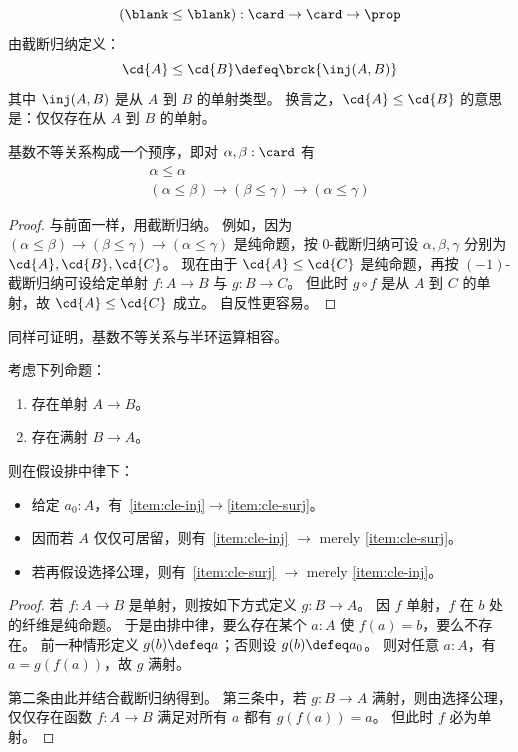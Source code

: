 \begin{defn}
  \[ (\blank\le\blank) : \card\to\card\to\prop \]
  由截断归纳定义：
  \[ \cd{A} \le \cd{B} \defeq \brck{\inj(A,B)} \]
  其中 $\inj(A,B)$ 是从 $A$ 到 $B$ 的单射类型。
  换言之，$\cd{A} \le \cd{B}$ 的意思是：仅仅存在从 $A$ 到 $B$ 的单射。
\end{defn}

\begin{lem}
  基数不等关系构成一个预序，即对 $\alpha,\beta:\card$ 有
  \begin{gather*}
    \alpha \le \alpha\\
    (\alpha \le \beta) \to (\beta\le\gamma) \to (\alpha\le\gamma)
  \end{gather*}
\end{lem}
\begin{proof}
  与前面一样，用截断归纳。
  例如，因为 $(\alpha \le \beta) \to (\beta\le\gamma) \to (\alpha\le\gamma)$ 是纯命题，按 0-截断归纳可设 $\alpha,\beta,\gamma$ 分别为 $\cd{A},\cd{B},\cd{C}$。
  现在由于 $\cd{A} \le \cd{C}$ 是纯命题，再按 $(-1)$-截断归纳可设给定单射 $f:A\to B$ 与 $g:B\to C$。
  但此时 $g\circ f$ 是从 $A$ 到 $C$ 的单射，故 $\cd{A} \le \cd{C}$ 成立。
  自反性更容易。
\end{proof}

同样可证明，基数不等关系与半环运算相容。

\begin{lem}\label{thm:injsurj}
  考虑下列命题：
  \begin{enumerate}
  \item 存在单射 $A\to B$。\label{item:cle-inj}
  \item 存在满射 $B\to A$。\label{item:cle-surj}
  \end{enumerate}
  则在假设排中律下：
  \begin{itemize}
  \item 给定 $a_0:A$，有~\ref{item:cle-inj}$\to$\ref{item:cle-surj}。
  \item 因而若 $A$ 仅仅可居留，则有~\ref{item:cle-inj} $\to$ merely \ref{item:cle-surj}。
  \item 若再假设选择公理，则有~\ref{item:cle-surj} $\to$ merely \ref{item:cle-inj}。
  \end{itemize}
\end{lem}
\begin{proof}
  若 $f:A\to B$ 是单射，则按如下方式定义 $g:B\to A$。
  因 $f$ 单射，$f$ 在 $b$ 处的纤维是纯命题。
  于是由排中律，要么存在某个 $a:A$ 使 $f(a)=b$，要么不存在。
  前一种情形定义 $g(b)\defeq a$；否则设 $g(b)\defeq a_0$。
  则对任意 $a:A$，有 $a = g(f(a))$，故 $g$ 满射。

  第二条由此并结合截断归纳得到。
  第三条中，若 $g:B\to A$ 满射，则由选择公理，仅仅存在函数 $f:A\to B$ 满足对所有 $a$ 都有 $g(f(a)) = a$。
  但此时 $f$ 必为单射。
\end{proof}

